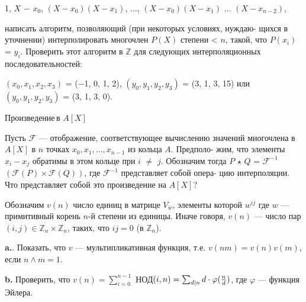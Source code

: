 \documentclass{mai_book}
\begin{document}
\begin{center}
1, $X$ $-$ $x_0$, $(X - x_0)(X - x_1)$, $\dots$, $(X - x_0)(X - x_1)$ $\dots$ $(X - x_{n-2})$,
\end{center}

\noindent написать алгоритм, позволяющий (при некоторых условиях, нуждаю­- \linebreak
щихся в уточнении) интерполировать многочлен $P(X)$ степени < $n$, \linebreak
такой, что $P(x_i)$ = $y_i$. Проверить этот алгоритм в $\mathbb Z$ для следующих \linebreak
интерполяционных последовательностей:

\begin{center}
$(x_0, x_1, x_2, x_3)$ = ($-$1, 0, 1, 2), \hspace{10pt} $(y_0, y_1,y_2, y_3)$ = (3, 1, 3, 15) \newline
или \hspace{5pt} $(y_0, y_1,y_2, y_3)$ = (3, 1, 3, 0).
\end{center}

$\mathbf{Произведение\,в}$ $A[X]$ \ 

\hspace{5pt} Пусть $\mathcal{F}$ --- отображение, соответствующее вычислению значений \linebreak
многочлена в $A[X]$ в $n$ точках $x_0, x_1, \dots, x_{n-1}$ из кольца $A$.  Предполо­- \linebreak
жим, что элементы $x_i-x_j$ обратимы в этом кольце при $i$ $\ne$ $j$.  Обозначим \linebreak
тогда $P$ $\star$ $Q$ = $\mathcal{F}^{-1}$ $(\mathcal{F}(P) \times \mathcal{F}(Q))$, где $\mathcal{F}^{-1}$ представляет собой опера­- \linebreak
цию интерполяции. Что представляет собой это произведение на $A[X]$? \newpage

\medskip

Обозначим $v(n)$ число единиц в матрице $V_w$, элементы которой $w^{ij}$ где $w$ — примитивный корень $n$-й степени из единицы. Иначе говоря,
$v(n)$ — число пар $(i, j) \in \mathbb Z_n \times \mathbb Z_n$, таких, что $ij = 0$ (в $\mathbb Z_n$).

{\bf a.}. Показать, что $v$ — мультипликативная функция, т.е.
$v(nm)=v(n)v(m)$, если $n \wedge m = 1$.

{\bf b.} Проверить, что $v(n) = \sum_{i=0}^{n-1}$ НОД$(i,n) = \sum_{d|n}d \cdot \varphi({n \over d})$, где $\varphi$ — функция Эйлера.
\end{document}
